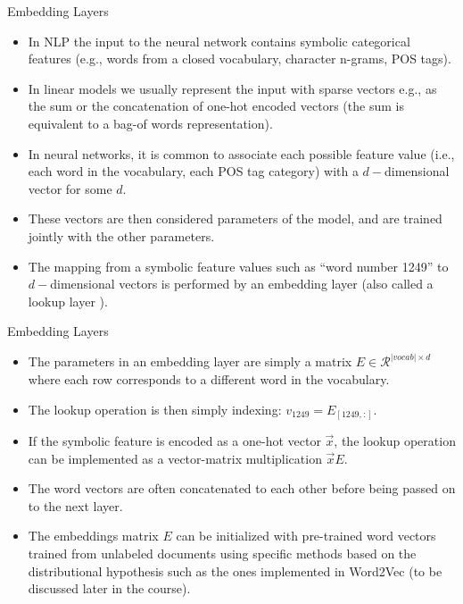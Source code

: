 \documentclass[handout]{beamer}
\begin{document}
\begin{frame}{Embedding Layers}
\begin{scriptsize}
\begin{itemize}

\item In NLP the input to the neural network contains symbolic categorical features (e.g., words from a closed vocabulary, character n-grams, POS tags).

\item In linear models we usually represent the input with sparse vectors e.g., as the sum or the concatenation of one-hot encoded vectors (the sum is equivalent to a bag-of words representation). 

\item In neural networks, it is common to associate each possible feature value (i.e., each word in the vocabulary, each POS tag category) with a $d-$dimensional vector for some $d$.

\item These vectors are then considered parameters of the model, and are trained jointly with the other parameters.

\item The mapping from a symbolic feature values such as ``word number 1249'' to $d-$dimensional vectors is performed by an embedding layer (also called a lookup layer ).

\end{itemize}
\end{scriptsize}
\end{frame}


\begin{frame}{Embedding Layers}
\begin{scriptsize}
\begin{itemize}

\item The parameters in an embedding layer are simply a matrix $E \in \mathcal{R}^{|vocab|\times d}$ where each row corresponds to a different word in the vocabulary.

\item The lookup operation is then simply indexing: $v_{1249} = E_{[1249,:]}$.

\item If the symbolic feature is encoded as a one-hot vector $\vec{x}$, the lookup operation can be implemented as a vector-matrix multiplication $\vec{x}E$.

\item The word vectors are often concatenated to each other before being passed on to the next layer.


\item The embeddings matrix $E$ can be initialized with pre-trained word vectors trained from unlabeled documents using specific methods based on the distributional hypothesis such as the ones implemented in Word2Vec (to be discussed later in the course).


\end{itemize}
\end{scriptsize}
\end{frame}
\end{document}
